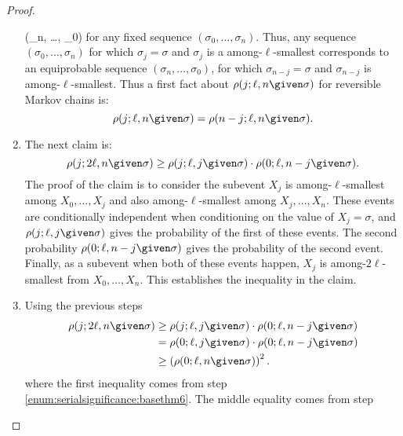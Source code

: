 \documentclass[12pt]{article}
\begin{document}
\begin{proof}
\begin{enumerate}
            (\sigma_n, \dots, \sigma_0) \) for any fixed sequence \( (\sigma_0,
            \dots, \sigma_n ) \).  Thus, any sequence \( (\sigma_0,\dots,
            \sigma_n ) \) for which \( \sigma_j = \sigma \) and \(
            \sigma_j \) is a among-\( \ell \)-smallest corresponds to an
            equiprobable sequence \( (\sigma_n,\dots, \sigma_0 ) \), for
            which \( \sigma_{n-j} = \sigma \) and \( \sigma_{n-j} \) is
            among-\( \ell \)-smallest.  Thus a first fact about \( \rho(j;
            \ell, n \given \sigma) \) for reversible Markov chains is:
            \[
                \rho(j; \ell, n \given \sigma) = \rho(n-j; \ell, n
                \given \sigma).
            \]
        \item
            \label{enum:serialsignificance:basethm6} The next claim is:
            \[
                \rho(j; 2\ell, n \given \sigma) \ge \rho(j; \ell, j
                \given \sigma) \cdot \rho(0; \ell, n-j \given \sigma).
            \] The proof of the claim is to consider the subevent \( X_j
            \) is among-\( \ell \)-smallest among \( X_0, \dots, X_j \)
            and also among-\( \ell \)-smallest among \( X_j, \dots, X_n \).
            These events are conditionally independent when conditioning
            on the value of \( X_j = \sigma \), and \( \rho(j; \ell, j
            \given \sigma) \) gives the probability of the first of
            these events.  The second probability \( \rho(0; \ell, n-j
            \given \sigma) \) gives the probability of the second event.
            Finally, as a subevent when both of these events happen, \(
            X_j \) is among-\( 2\ell \)-smallest from \( X_0, \dots, X_n
            \).  This establishes the inequality in the claim.
        \item
            \label{enum:serialsignificance:basethm7} Using the previous
            steps
            \begin{align*}
                \rho(j; 2\ell, n \given \sigma) &\ge \rho(j; \ell, j
                \given \sigma) \cdot \rho(0; \ell, n-j \given \sigma) \\
                &= \rho(0; \ell, j \given \sigma) \cdot \rho(0; \ell,
                n-j \given \sigma) \\
                &\ge \left( \rho(0; \ell, n \given \sigma) \right)^2.
            \end{align*}
            where the first inequality comes from step~%
            \ref{enum:serialsignificance:basethm6}.  The middle equality
            comes from step~%

\end{enumerate}
\end{proof}
\end{document}
